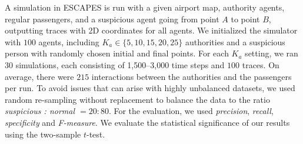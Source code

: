 A simulation in ESCAPES is run with a given airport map, authority agents, regular passengers, and a suspicious agent going from point $A$ to point $B$, outputting traces with 2D coordinates for all agents. 
We initialized the simulator with $100$ agents, including $K_a \in \{5,10,15,20,25\}$ authorities and a suspicious person with randomly chosen initial and final points. For each $K_a$ setting, we ran $30$ simulations, each consisting of 1,500--3,000 time steps and $100$ traces. On average, there were $215$ interactions between the authorities and the passengers per run. 
%
To avoid issues that can arise with highly unbalanced datasets, we used random re-sampling without replacement to balance the data to the ratio \textit{suspicious : normal $=20:80$}. %
For the evaluation, we used \emph{precision}, \emph{recall}, \emph{specificity} and \emph{F-measure}. 
We evaluate the statistical significance of our results using the two-sample $t$-test.








